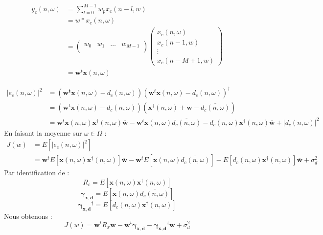 \documentclass[12pt]{article}
\begin{document}
$$$$
\begin{align}
    y_c(n,\omega) &= \sum_{l=0}^{M-1} w_p x_c(n-l,w) \nonumber \\
    &= w * x_c(n,\omega) \nonumber \\
    &= \begin{pmatrix}
        w_0 & w_1 & \dots & w_{M-1} \\
    \end{pmatrix}
    \begin{pmatrix}
        x_c(n,\omega) \\
        x_c(n-1,w) \\
        \vdots \\
        x_c(n-M+1,w)
    \end{pmatrix} \nonumber \\
    &= \mathbf{w}^t \mathbf{x}(n,\omega) \nonumber
\end{align}

\begin{align}
    |e_c(n,\omega)|^2 &= \left( \mathbf{w^t} \mathbf{x}(n,\omega) - d_c(n,\omega) \right) \left( \mathbf{w}^t\mathbf{x}(n,\omega) - d_c(n,\omega) \right) ^\dag \nonumber \\
    &= \left( \mathbf{w}^t \mathbf{x}(n,\omega) - d_c(n,\omega) \right) \left( \mathbf{x}^\dag (n,\omega) + \mathbf{\overline{w}} - \overline{d_c(n,\omega)} \right)  \nonumber \\
    &= \mathbf{w}^t \mathbf{x}(n,\omega) \mathbf{x}^\dag (n,\omega) \overline{\mathbf{w}}  - \mathbf{w}^t \mathbf{x}(n,\omega) \overline{d_c(n,\omega)} - d_c(n,\omega) \mathbf{x}^\dag (n,\omega) \mathbf{\overline{w}} + |d_c(n,\omega)|^2 \nonumber
\end{align}
En faisant la moyenne sur $\omega \in \Omega$ :
\begin{align}
    J(w) &= E\left[ |e_c(n,\omega)|^2 \right] \nonumber \\
    &= \mathbf{w}^t E[\mathbf{x}(n,\omega) \mathbf{x}^\dag (n,\omega)] \overline{\mathbf{w}} - \mathbf{w}^t E[\mathbf{x}(n,\omega) \overline{d_c(n,\omega)}] - E[d_c(n,\omega) \mathbf{x}^\dag (n,\omega)] \mathbf{\overline{w}} + \sigma_d^2 \nonumber 
\end{align}
Par identification de :$$R_c = E[\mathbf{x}(n,\omega) \mathbf{x}^\dag (n,\omega)]$$
$$\mathbf{\gamma_{x,d}} = E[\mathbf{x}(n,\omega) \overline{d_c(n,\omega)}]$$
$$\mathbf{\gamma_{x,d}}^\dag = E[d_c(n,\omega) \mathbf{x}^\dag (n,\omega)]$$
Nous obtenons : $$J(w) = \mathbf{w}^t R_x \overline{\mathbf{w}} - \mathbf{w}^t \mathbf{\gamma_{x,d}}  - \mathbf{\gamma_{x,d}}^\dag \mathbf{\overline{w}} + \sigma_d^2$$
\end{document}
